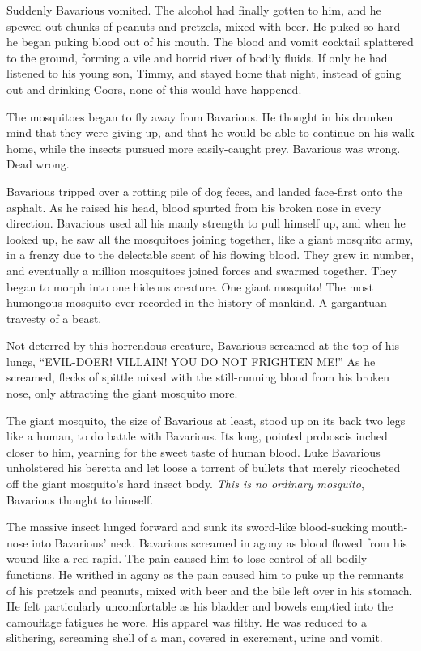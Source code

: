 Suddenly Bavarious vomited. The alcohol had finally gotten to him,
and he spewed out chunks of peanuts and pretzels, mixed with beer.
He puked so hard he began puking blood out of his mouth. The blood
and vomit cocktail splattered to the ground, forming a vile and
horrid river of bodily fluids. If only he had listened to his young
son, Timmy, and stayed home that night, instead of going out and
drinking Coors, none of this would have happened.



The mosquitoes began to fly away from Bavarious. He thought in his
drunken mind that they were giving up, and that he would be able to
continue on his walk home, while the insects pursued more
easily-caught prey. Bavarious was wrong. Dead wrong.



Bavarious tripped over a rotting pile of dog feces, and landed
face-first onto the asphalt. As he raised his head, blood spurted
from his broken nose in every direction. Bavarious used all his
manly strength to pull himself up, and when he looked up, he saw
all the mosquitoes joining together, like a giant mosquito army, in
a frenzy due to the delectable scent of his flowing blood. They
grew in number, and eventually a million mosquitoes joined forces
and swarmed together. They began to morph into one hideous
creature. One giant mosquito! The most humongous mosquito ever
recorded in the history of mankind. A gargantuan travesty of a
beast.



Not deterred by this horrendous creature, Bavarious screamed at the
top of his lungs, ``EVIL-DOER! VILLAIN! YOU DO NOT FRIGHTEN
ME!'' As he screamed, flecks of spittle mixed with the
still-running blood from his broken nose, only attracting the giant
mosquito more.



The giant mosquito, the size of Bavarious at least, stood up on its
back two legs like a human, to do battle with Bavarious. Its long,
pointed proboscis inched closer to him, yearning for the sweet
taste of human blood. Luke Bavarious unholstered his beretta and
let loose a torrent of bullets that merely ricocheted off the giant
mosquito's hard insect body. {\em This is no ordinary
mosquito}, Bavarious thought to himself.



The massive insect lunged forward and sunk its sword-like
blood-sucking mouth-nose into Bavarious' neck. Bavarious
screamed in agony as blood flowed from his wound like a red rapid.
The pain caused him to lose control of all bodily functions. He
writhed in agony as the pain caused him to puke up the remnants of
his pretzels and peanuts, mixed with beer and the bile left over in
his stomach. He felt particularly uncomfortable as his bladder and
bowels emptied into the camouflage fatigues he wore. His apparel
was filthy. He was reduced to a slithering, screaming shell of a
man, covered in excrement, urine and vomit.



